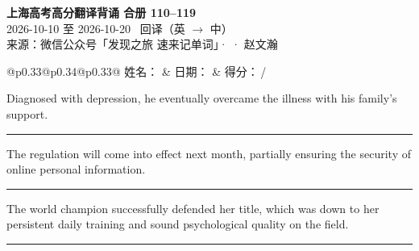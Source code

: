 \documentclass[11pt,a4paper]{article}
\newcommand{\num}[1]{\makebox[1.9em][r]{#1.}\hspace{0.3em}}
\newcommand{\wline}{\noindent\rule{\linewidth}{0.4pt}}
\begin{document}
\pagestyle{plain}
\begin{center}
{\LARGE\bfseries 上海高考高分翻译背诵 \quad 合册 110–119}\\[0.25em]
{\large 2026-10-10 至 2026-10-20 \quad\ 回译（英 $\to$ 中）}\\[0.35em]
{\footnotesize 来源：微信公众号「发现之旅 速来记单词」·  · 赵文瀚}
\end{center}

\vspace{0.4em}
\noindent\begin{tabular}{@{}p{0.33\textwidth}@{}p{0.34\textwidth}@{}p{0.33\textwidth}@{}}
姓名：\underline{\hspace{2.0cm}} & 日期：\underline{\hspace{2.0cm}} & 得分：\underline{\hspace{1.4cm}}\,/ \\
\end{tabular}

\vspace{0.5em}

\vspace{0.8em}
\vspace{0.35em}\vspace{0.15em}

\begin{minipage}{\linewidth}

\num{1}Diagnosed with depression, he eventually overcame the illness with his family’s support.

\vspace{0.25em}

\wline

\end{minipage}

\begin{minipage}{\linewidth}

\num{2}The regulation will come into effect next month, partially ensuring the security of online personal information.

\vspace{0.25em}

\wline

\end{minipage}

\begin{minipage}{\linewidth}

\num{3}The world champion successfully defended her title, which was down to her persistent daily training and sound psychological quality on the field.

\vspace{0.25em}

\wline

\end{minipage}
\end{document}
